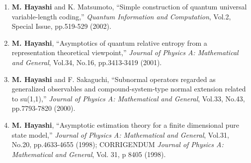 \documentclass[a4paper,12pt,oneside]{article}
\begin{document}
\begin{enumerate}
\item
\textbf{M. Hayashi} and K. Matsumoto, ``Simple construction of quantum universal variable-length coding,'' 
{\em Quantum Information and Computation}, Vol.2, Special Issue, pp.519-529 (2002).

\item
\textbf{M. Hayashi}, ``Asymptotics of quantum relative entropy from a representation theoretical viewpoint,'' 
{\em Journal of Physics A: Mathematical and General}, Vol.34, No.16, pp.3413-3419 (2001).

\item
\textbf{M. Hayashi} and F. Sakaguchi, ``Subnormal operators regarded as generalized observables and compound-system-type normal extension related to su(1,1),'' 
{\em Journal of Physics A: Mathematical and General}, Vol.33, No.43, pp.7793-7820 (2000).

\item
\textbf{M. Hayashi}, ``Asymptotic estimation theory for a finite dimensional pure state model,'' 
{\em Journal of Physics A: Mathematical and General}, Vol.31, No.20, pp.4633-4655 (1998); 
CORRIGENDUM {\em Journal of Physics A: Mathematical and General}, Vol. 31, p 8405 (1998).
\end{enumerate}
\end{document}
